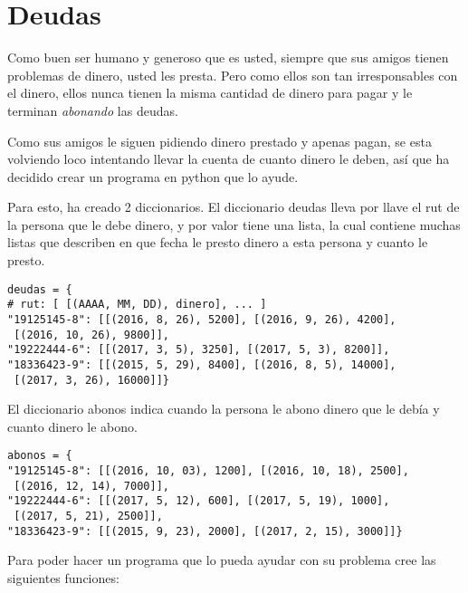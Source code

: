 \section{Deudas}

Como buen ser humano y generoso que es usted, siempre que sus amigos tienen problemas de dinero, usted les presta. Pero como ellos son tan irresponsables con el dinero, ellos nunca tienen la misma cantidad de dinero para pagar y le terminan \textit{abonando} las deudas.

Como sus amigos le siguen pidiendo dinero prestado y apenas pagan, se esta volviendo loco intentando llevar la cuenta de cuanto dinero le deben, así que ha decidido crear un programa en python que lo ayude.

Para esto, ha creado 2 diccionarios. El diccionario deudas lleva por llave el rut de la persona que le debe dinero, y por valor tiene una lista, la cual contiene muchas listas que describen en que fecha le presto dinero a esta persona y cuanto le presto.

\begin{lstlisting}[style=consola]
deudas = {
# rut: [ [(AAAA, MM, DD), dinero], ... ]
"19125145-8": [[(2016, 8, 26), 5200], [(2016, 9, 26), 4200],
 [(2016, 10, 26), 9800]],
"19222444-6": [[(2017, 3, 5), 3250], [(2017, 5, 3), 8200]], 
"18336423-9": [[(2015, 5, 29), 8400], [(2016, 8, 5), 14000],
 [(2017, 3, 26), 16000]]}
\end{lstlisting}

El diccionario abonos indica cuando la persona le abono dinero que le debía y cuanto dinero le abono.

\begin{lstlisting}[style=consola]
abonos = {
"19125145-8": [[(2016, 10, 03), 1200], [(2016, 10, 18), 2500],
 [(2016, 12, 14), 7000]],
"19222444-6": [[(2017, 5, 12), 600], [(2017, 5, 19), 1000],
 [(2017, 5, 21), 2500]], 
"18336423-9": [[(2015, 9, 23), 2000], [(2017, 2, 15), 3000]]}
\end{lstlisting}

Para poder hacer un programa que lo pueda ayudar con su problema cree las siguientes funciones:

